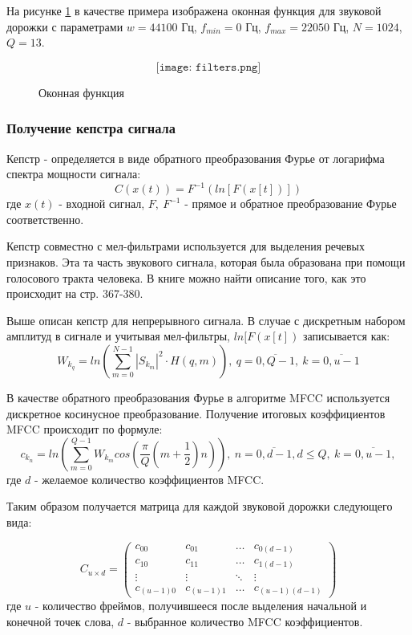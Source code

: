 На рисунке \ref{fig:filters} в качестве примера изображена оконная функция для звуковой дорожки с параметрами $w=44100$ Гц, $f_{min}=0$ Гц, $f_{max}=22050$ Гц, $N=1024$, $Q=13$.

\begin{figure}[H]
	\[\texttt{[image: filters.png]}\]
	\caption{Оконная функция}
	\label{fig:filters}
\end{figure}

\subsubsection{Получение кепстра сигнала}
Кепстр -  определяется в виде обратного преобразования Фурье от логарифма спектра мощности сигнала:
\begin{equation}
	C(x(t))=F^{-1}(ln[F(x[t])])
\end{equation}
где $x(t)$ - входной сигнал, $F,~F^{-1}$ - прямое и обратное преобразование Фурье соответственно.

Кепстр совместно с мел-фильтрами используется для выделения речевых признаков. Эта та часть звукового сигнала, которая была образована при помощи голосового тракта человека. В книге \cite{CeptrumExplanation} можно найти описание того, как это происходит на стр. 367-380. 

Выше описан кепстр для непрерывного сигнала. В случае с дискретным набором амплитуд в сигнале и учитывая мел-фильтры, $ln[F(x[t])$ записывается как:
\begin{equation}
	W_{k_q} = ln(\sum_{m=0}^{N-1} |S_{k_m}|^2 \cdot H(q,m)),~q=\overline{0,Q-1},~k=\overline{0,u-1}
\end{equation}

В качестве обратного преобразования Фурье в алгоритме MFCC используется дискретное косинусное преобразование. Получение итоговых коэффициентов MFCC происходит по формуле:
\begin{equation}
	c_{k_n} = ln(\sum_{m=0}^{Q-1} W_{k_m} cos(\dfrac{\pi}{Q} (m+\dfrac{1}{2})n)),~n=\overline{0,d-1},d \le Q,~k=\overline{0,u-1},
\end{equation}
где $d$ - желаемое количество коэффициентов MFCC.

Таким образом получается матрица для каждой звуковой дорожки следующего вида:

\begin{equation*}
	C_{u \times d} = \left(
	\begin{array}{cccc}
		c_{00} & c_{01} & \ldots & c_{0(d-1)}\\
		c_{10} &  c_{11} & \ldots & c_{1(d-1)}\\
		\vdots & \vdots & \ddots & \vdots\\
		c_{(u-1)0} & c_{(u-1)1} & \ldots & c_{(u-1)(d-1)}
	\end{array}
	\right)
\end{equation*}
где $u$ - количество фреймов, получившееся после выделения начальной и конечной точек слова, $d$ - выбранное количество MFCC коэффициентов.

